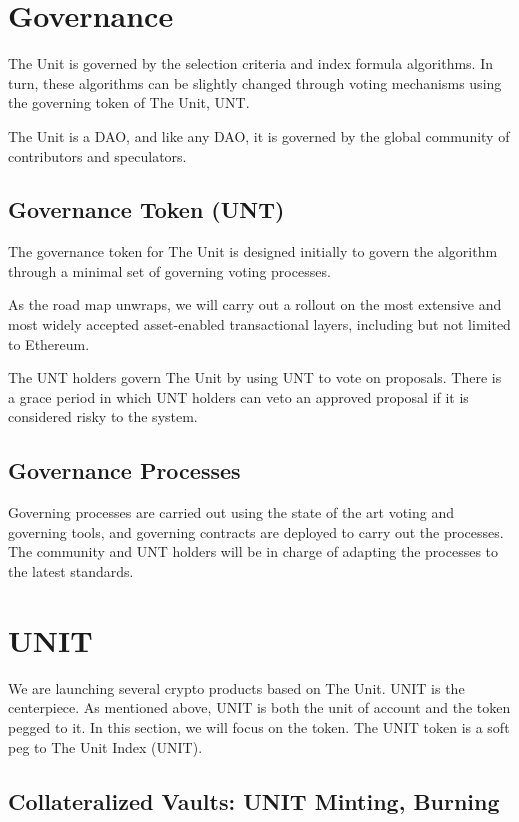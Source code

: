 \documentclass[12pt]{article}
\begin{document}
\section{Governance}

The Unit is governed by the selection criteria and index formula algorithms. In turn, these algorithms can be slightly changed through voting mechanisms using the governing token of The Unit, UNT.

The Unit is a DAO, and like any DAO, it is governed by the global community of contributors and speculators. 

\subsection{Governance Token (UNT)}

The governance token for The Unit is designed initially to govern the algorithm through a minimal set of governing voting processes. 

As the road map unwraps, we will carry out a rollout on the most extensive and most widely accepted asset-enabled transactional layers, including but not limited to Ethereum.

The UNT holders govern The Unit by using UNT to vote on proposals. There is a grace period in which UNT holders can veto an approved proposal if it is considered risky to the system.

\subsection{Governance Processes}

Governing processes are carried out using the state of the art voting and governing tools, and governing contracts are deployed to carry out the processes. The community and UNT holders will be in charge of adapting the processes to the latest standards.

\section{UNIT}

We are launching several crypto products based on The Unit. UNIT is the centerpiece. As mentioned above, UNIT is both the unit of account and the token pegged to it. In this section, we will focus on the token. The UNIT token is a soft peg to The Unit Index (UNIT).

\subsection{Collateralized Vaults: UNIT Minting, Burning}
\end{document}

